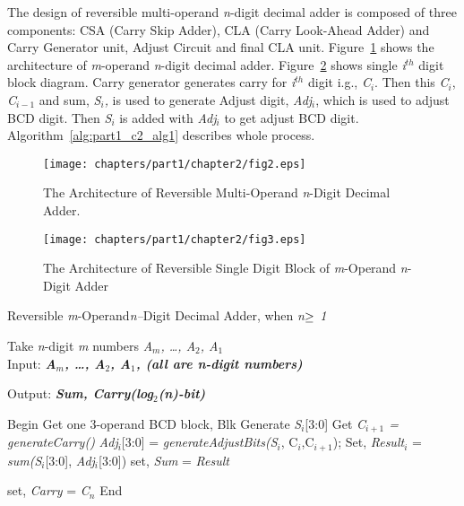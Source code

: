 The design of reversible multi-operand {\it n}-digit decimal adder is composed of three components: CSA (Carry Skip Adder), CLA (Carry Look-Ahead Adder) and Carry Generator unit, Adjust Circuit and final CLA unit. Figure~\ref{fig:p1_c2_fig2} shows the architecture of {\it m}-operand {\it n}-digit decimal adder. Figure~\ref{fig:p1_c2_fig3} shows single {\it i${}^{th}$} digit block diagram. Carry generator generates carry for {\it i${}^{th}$} digit i.g., {\it C${}_{i}$}. Then this {\it C${}_{i}$}, {\it C${}_{i-1}$} and sum, {\it S${}_{i}$,} is used to generate Adjust digit, {\it Adj${}_{i}$}, which is used to adjust BCD digit. Then {\it S${}_{i}$} is added with {\it Adj${}_{i}$} to get adjust BCD digit. Algorithm~\ref{alg:part1_c2_alg1} describes whole process.

\begin{figure}[!tbh]
	\centering
	\texttt{[image: chapters/part1/chapter2/fig2.eps]}
	\caption{The Architecture of Reversible Multi-Operand {\it n}-Digit Decimal Adder.}
	\label{fig:p1_c2_fig2}
\end{figure}

\begin{figure}[!tbh]
	\centering
	\texttt{[image: chapters/part1/chapter2/fig3.eps]}
	\caption{The Architecture of Reversible Single Digit Block of {\it m}-Operand {\it n}-Digit Adder}
	\label{fig:p1_c2_fig3}
\end{figure}

\begin{algorithm}[!h]
	\caption{Reversible {\it m}-Operand{\it n--}Digit Decimal Adder, when {\it n$\bold{\ge}$ 1}}
	Take \textit{n}-digit \textit{m} numbers {\it A${}_{m}$, {\dots}, A${}_{2}$, A${}_{1}$}
	\label{alg:part1_c2_alg1}
	\\Input: {\bf {\it A${}_{m}$, {\dots}, A${}_{2}$, A${}_{1}$, (all are n-digit numbers)}}
	
	{\bf {\it  }}Output: {\bf {\it Sum, Carry(log${}_{2}$(n)-bit)}}
	\begin{algorithmic}[1]
		
		\STATE Begin
		\STATE Get one 3-operand BCD block, Blk
		\STATE Generate \textit{S}${}_{i}$[3:0]
		\STATE Get\textit{ C${}_{i+1}$ = generateCarry()}
		\STATE \textit{Adj}${}_{i}$[3:0] = \textit{generateAdjustBits(S${}_{i}$}, C${}_{i}$,C${}_{i+1}$);        
		\STATE Set, \textit{Result}${}_{i}$ = \textit{sum(S}${}_{i}$[3:0], \textit{Adj}${}_{i}$[3:0]) 
		\ENDFOR
		\STATE set, {\it Sum} =\textit{ Result}
		
		\STATE set, {\it Carry} = \textit{C}${}_{n}${\bf }
		\STATE End
	\end{algorithmic}
\end{algorithm}

